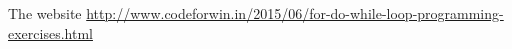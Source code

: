 The website
\url{http://www.codeforwin.in/2015/06/for-do-while-loop-programming-exercises.html}

\begin{comment}
  \begin{multicols}{2}
    \begin{lstlisting}
    \end{lstlisting}
    \columnbreak
    \begin{lstlisting}
    \end{lstlisting}
  \end{multicols}
  \begin{multicols}{2}
    \begin{lstlisting}
    \end{lstlisting}
    \columnbreak
    \begin{lstlisting}
    \end{lstlisting}
  \end{multicols}
\end{comment}
